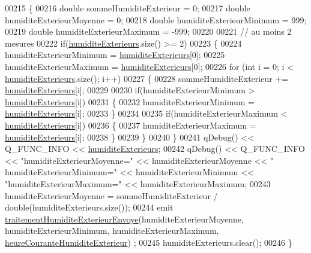 \begin{DoxyCode}
00215 \{
00216     \textcolor{keywordtype}{double} sommeHumiditeExterieur = 0;
00217     \textcolor{keywordtype}{double} humiditeExterieurMoyenne = 0;
00218     \textcolor{keywordtype}{double} humiditeExterieurMinimum = 999;
00219     \textcolor{keywordtype}{double} humiditeExterieurMaximum = -999;
00220 
00221     \textcolor{comment}{// au moins 2 mesures}
00222     \textcolor{keywordflow}{if}(\hyperlink{class_infos_humidite_a62d1331116ee1cf00cb8fa369a214c62}{humiditeExterieurs}.size() >= 2)
00223     \{
00224         humiditeExterieurMinimum = \hyperlink{class_infos_humidite_a62d1331116ee1cf00cb8fa369a214c62}{humiditeExterieurs}[0];
00225         humiditeExterieurMaximum = \hyperlink{class_infos_humidite_a62d1331116ee1cf00cb8fa369a214c62}{humiditeExterieurs}[0];
00226         \textcolor{keywordflow}{for} (\textcolor{keywordtype}{int} i = 0; i < \hyperlink{class_infos_humidite_a62d1331116ee1cf00cb8fa369a214c62}{humiditeExterieurs}.size(); i++)
00227         \{
00228             sommeHumiditeExterieur += \hyperlink{class_infos_humidite_a62d1331116ee1cf00cb8fa369a214c62}{humiditeExterieurs}[i];
00229 
00230             \textcolor{keywordflow}{if}(humiditeExterieurMinimum > \hyperlink{class_infos_humidite_a62d1331116ee1cf00cb8fa369a214c62}{humiditeExterieurs}[i])
00231             \{
00232                 humiditeExterieurMinimum = \hyperlink{class_infos_humidite_a62d1331116ee1cf00cb8fa369a214c62}{humiditeExterieurs}[i];
00233             \}
00234 
00235             \textcolor{keywordflow}{if}(humiditeExterieurMaximum < \hyperlink{class_infos_humidite_a62d1331116ee1cf00cb8fa369a214c62}{humiditeExterieurs}[i])
00236             \{
00237                 humiditeExterieurMaximum = \hyperlink{class_infos_humidite_a62d1331116ee1cf00cb8fa369a214c62}{humiditeExterieurs}[i];
00238             \}
00239         \}
00240     \}
00241     qDebug() << Q\_FUNC\_INFO << \hyperlink{class_infos_humidite_a62d1331116ee1cf00cb8fa369a214c62}{humiditeExterieurs};
00242     qDebug() << Q\_FUNC\_INFO << \textcolor{stringliteral}{"humiditeExterieurMoyenne="} << humiditeExterieurMoyenne << \textcolor{stringliteral}{"
      humiditeExterieurMinimum="} << humiditeExterieurMinimum << \textcolor{stringliteral}{"humiditeExterieurMaximum="} << humiditeExterieurMaximum;
00243     humiditeExterieurMoyenne = sommeHumiditeExterieur / double(humiditeExterieurs.size());
00244     emit \hyperlink{class_infos_humidite_abd0535dee74a4588232d282d0fe64829}{traitementHumiditeExterieurEnvoye}(humiditeExterieurMoyenne, 
      humiditeExterieurMinimum, humiditeExterieurMaximum, \hyperlink{class_infos_humidite_ad7b450373a47ec831872872e0e5674ad}{heureCouranteHumiditeExterieur})
      ;
00245     humiditeExterieurs.clear();
00246 \}
\end{DoxyCode}
\mbox{\label{class_infos_humidite_acd903311f6c949f8f010b330f517e4f3}} 
